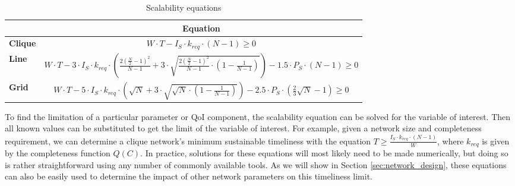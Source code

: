 \begin{table}[]
\centering
\begin{tabular}{l|l|}
\cline{2-2}
                             & \multicolumn{1}{c|}{{\bf Equation}} \\ \hline
\multicolumn{1}{|l|}{\textbf{Clique}} & \multicolumn{1}{c|}{$W \cdot T - I_S \cdot k_{req} \cdot (N-1) \geq 0$}            \\ \hline
\multicolumn{1}{|l|}{\textbf{Line}}   & \multicolumn{1}{c|}{$W \cdot T - 3 \cdot I_S \cdot k_{req} \cdot (\frac{2(\frac{N}{2}-1)^2}{N-1} + 3 \cdot \sqrt{\frac{2(\frac{N}{2}-1)^2}{N-1} \cdot (1 - \frac{1}{N-1})}) - 1.5 \cdot P_S \cdot (N-1) \geq 0$}       \\ \hline
\multicolumn{1}{|l|}{\textbf{Grid}}   & \multicolumn{1}{c|}{$W \cdot T - 5 \cdot I_S \cdot k_{req} \cdot (\sqrt{N} + 3 \cdot \sqrt{\sqrt{N} \cdot (1 - \frac{1}{N-1})}) - 2.5 \cdot P_S \cdot (\frac{2}{3}\sqrt{N} - 1) \geq 0$}      \\ \hline
\end{tabular}
\caption{Scalability equations}
\label{table:scal_eqs}
\end{table}

To find the limitation of a particular parameter or QoI component, the scalability equation can be solved for the variable of interest.  Then all known values can be substituted to get the limit of the variable of interest.  For example, given a network size and completeness requirement, we can determine a clique network's minimum sustainable timeliness with the equation $T  \geq \frac{I_S \cdot k_{req} \cdot (N-1)}{W}$, where $k_{req}$ is given by the completeness function $Q(C)$.  In practice, solutions for these equations will most likely need to be made numerically, but doing so is rather straightforward using any number of commonly available tools.  As we will show in Section \ref{sec:network_design}, these equations can also be easily used to determine the impact of other network parameters on this timeliness limit. 



